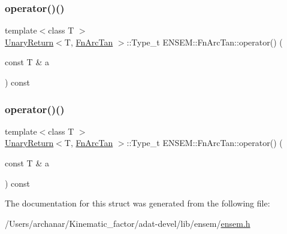 \mbox{\label{structENSEM_1_1FnArcTan_afb87d30d5f337130faf32e6af2c2669f}} 
\subsubsection{\texorpdfstring{operator()()}{operator()()}\hspace{0.1cm}{\footnotesize\ttfamily [2/3]}}
{\footnotesize\ttfamily template$<$class T $>$ \\
\mbox{\hyperlink{structENSEM_1_1UnaryReturn}{Unary\+Return}}$<$T, \mbox{\hyperlink{structENSEM_1_1FnArcTan}{Fn\+Arc\+Tan}} $>$\+::Type\+\_\+t E\+N\+S\+E\+M\+::\+Fn\+Arc\+Tan\+::operator() (\begin{DoxyParamCaption}\item[{const T \&}]{a }\end{DoxyParamCaption}) const\hspace{0.3cm}{\ttfamily [inline]}}

\mbox{\label{structENSEM_1_1FnArcTan_afb87d30d5f337130faf32e6af2c2669f}} 
\subsubsection{\texorpdfstring{operator()()}{operator()()}\hspace{0.1cm}{\footnotesize\ttfamily [3/3]}}
{\footnotesize\ttfamily template$<$class T $>$ \\
\mbox{\hyperlink{structENSEM_1_1UnaryReturn}{Unary\+Return}}$<$T, \mbox{\hyperlink{structENSEM_1_1FnArcTan}{Fn\+Arc\+Tan}} $>$\+::Type\+\_\+t E\+N\+S\+E\+M\+::\+Fn\+Arc\+Tan\+::operator() (\begin{DoxyParamCaption}\item[{const T \&}]{a }\end{DoxyParamCaption}) const\hspace{0.3cm}{\ttfamily [inline]}}



The documentation for this struct was generated from the following file\+:\begin{DoxyCompactItemize}
\item 
/\+Users/archanar/\+Kinematic\+\_\+factor/adat-\/devel/lib/ensem/\mbox{\hyperlink{adat-devel_2lib_2ensem_2ensem_8h}{ensem.\+h}}\end{DoxyCompactItemize}
